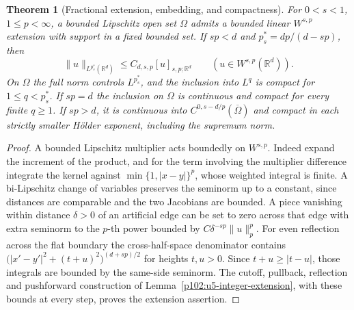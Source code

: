 \documentclass[11pt,oneside,openany]{book}
\newtheorem{theorem}{Theorem}[chapter]
\theoremstyle{definition}
\theoremstyle{remark}
\begin{document}
\begin{theorem}[Fractional extension, embedding, and compactness]
\label{p102:U5-05}
For \(0<s<1\), \(1\le p<\infty\), a bounded Lipschitz open set
\(\Omega\) admits a bounded linear \(W^{s,p}\) extension with
support in a fixed bounded set. If \(sp<d\) and
\(p_s^*=dp/(d-sp)\), then
\[
 \|u\|_{L^{p_s^*}(\mathbb R^d)}
 \le C_{d,s,p}[u]_{s,p;\mathbb R^d}
 \qquad (u\in W^{s,p}(\mathbb R^d)).
\]
On \(\Omega\) the full norm controls \(L^{p_s^*}\), and the
inclusion into \(L^q\) is compact for \(1\le q<p_s^*\).
If \(sp=d\) the inclusion on \(\Omega\) is continuous and compact
for every finite \(q\ge1\). If \(sp>d\), it is continuous into
\(C^{0,s-d/p}(\overline\Omega)\) and compact in each strictly
smaller H\"older exponent, including the supremum norm.
\end{theorem}
\begin{proof}
A bounded Lipschitz multiplier acts boundedly on \(W^{s,p}\).
Indeed expand the increment of the product, and for the term
involving the multiplier difference integrate the kernel against
\(\min\{1,|x-y|\}^p\), whose weighted integral is finite.
A bi-Lipschitz change of variables preserves the seminorm up to a
constant, since distances are comparable and the two Jacobians
are bounded. A piece vanishing within distance \(\delta>0\) of
an artificial edge can be set to zero across that edge with extra
seminorm to the \(p\)-th power bounded by
\(C\delta^{-sp}\|u\|_p^p\). For even reflection across the flat
boundary the cross-half-space denominator contains
\(\bigl(|x'-y'|^2+(t+u)^2\bigr)^{(d+sp)/2}\) for heights \(t,u>0\).
Since \(t+u\ge |t-u|\), those integrals are bounded by the
same-side seminorm. The cutoff, pullback, reflection and pushforward
construction of Lemma~\ref{p102:u5-integer-extension}, with these
bounds at every step, proves the extension assertion.


\end{proof}
\end{document}
